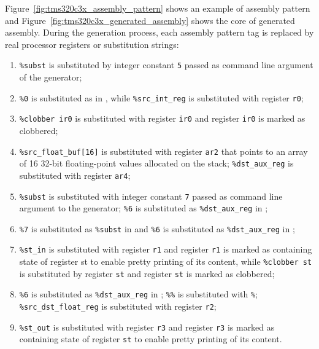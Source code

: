 Figure~\ref{fig:tms320c3x_assembly_pattern} shows an example of assembly pattern and Figure~\ref{fig:tms320c3x_generated_assembly} shows the core of generated assembly. 
During the generation process, each assembly pattern tag is replaced by real processor registers or substitution strings:
\begin{enumerate}
\item[{\large \ding{202}}] \texttt{\%subst} is substituted by integer constant \texttt{5} passed as command line argument of the generator;
\item[{\large \ding{203}}] \texttt{\%0} is substituted as in {\large {}}, while \texttt{\%src\_int\_reg} is substituted with register \texttt{r0};
\item[{\large \ding{204}}] \texttt{\%clobber ir0} is substituted with register \texttt{ir0} and register \texttt{ir0} is marked as clobbered;
\item[{\large \ding{205}}] \texttt{\%src\_float\_buf[16]} is substituted with register \texttt{ar2} that points to an array of 16 32-bit floating-point values allocated on the stack; \texttt{\%dst\_aux\_reg} is substituted with register \texttt{ar4};
\item[{\large \ding{206}}] \texttt{\%subst} is substituted with integer constant \texttt{7} passed as command line argument to the generator; \texttt{\%6} is substituted as \texttt{\%dst\_aux\_reg} in {\large {}};
\item[{\large \ding{207}}] \texttt{\%7} is substituted as \texttt{\%subst} in {\large {}} and \texttt{\%6} is substituted as \texttt{\%dst\_aux\_reg} in {\large {}};
\item[{\large \ding{208}}] \texttt{\%st\_in} is substituted with register \texttt{r1} and register \texttt{r1} is marked as containing state of register st to enable pretty printing of its content, while \texttt{\%clobber st} is substituted by register \texttt{st} and register \texttt{st} is marked as clobbered;
\item[{\large \ding{209}}] \texttt{\%6} is substituted as \texttt{\%dst\_aux\_reg} in {\large {}}; \texttt{\%\%} is substituted with \texttt{\%}; \texttt{\%src\_dst\_float\_reg} is substituted with register \texttt{r2};
\item[{\large \ding{210}}] \texttt{\%st\_out} is substituted with register \texttt{r3} and register \texttt{r3} is marked as containing state of register \texttt{st} to enable pretty printing of its content.
\end{enumerate}


